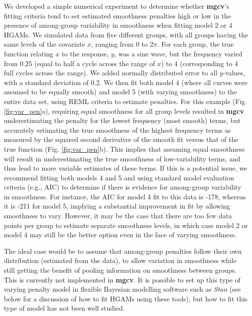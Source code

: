 \documentclass[12pt]{article}
\begin{document}
We developed a simple numerical experiment to determine whether
\textbf{mgcv}'s fitting criteria tend to set estimated smoothness
penalties high or low in the presence of among-group variability in
smoothness when fitting model 2 or 4 HGAMs. We simulated data from five
different groups, with all groups having the same levels of the
covariate \(x\), ranging from 0 to \(2\pi\). For each group, the true
function relating \(x\) to the response, \(y\), was a sine wave, but the
frequency varied from 0.25 (equal to half a cycle across the range of
\(x\)) to 4 (corresponding to 4 full cycles across the range). We added
normally distributed error to all \(y\)-values, with a standard
deviation of 0.2. We then fit both model 4 (where all curves were
assumed to be equally smooth) and model 5 (with varying smoothness) to
the entire data set, using REML criteria to estimate penalties. For this
example (Fig. \ref{fig:var_pen}a), requiring equal smoothness for all
group levels resulted in \textbf{mgcv} underestimating the penalty for
the lowest frequency (most smooth) terms, but accurately estimating the
true smoothness of the highest frequency terms as measured by the
squared second derivative of the smooth fit versus that of the true
function (Fig. \ref{fig:var_pen}b). This implies that assuming equal
smoothness will result in underestimating the true smoothness of
low-variability terms, and thus lead to more variable estimates of these
terms. If this is a potential issue, we recommend fitting both models 4
and 5 and using standard model evaluation criteria (e.g., AIC) to
determine if there is evidence for among-group variability in
smoothness. For instance, the AIC for model 4 fit to this data is -178,
whereas it is -211 for model 5, implying a substantial improvement in
fit by allowing smoothness to vary. However, it may be the case that
there are too few data points per group to estimate separate smoothness
levels, in which case model 2 or model 4 may still be the better option
even in the face of varying smoothness.

The ideal case would be to assume that among-group penalties follow
their own distribution (estimated from the data), to allow variation in
smoothness while still getting the benefit of pooling information on
smoothness between groups. This is currently not implemented in
\textbf{mgcv}. It is possible to set up this type of varying penalty
model in flexible Bayesian modelling software such as \emph{Stan} (see
below for a discussion of how to fit HGAMs using these tools), but how
to fit this type of model has not been well studied.
\end{document}
